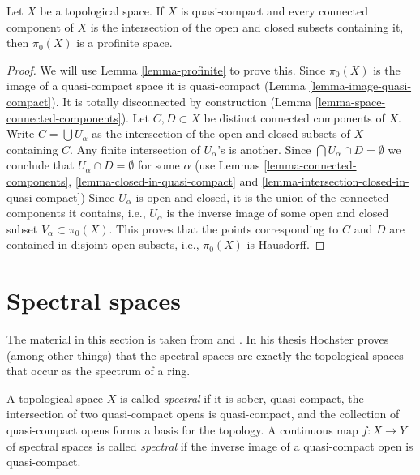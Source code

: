 \begin{lemma}
\label{lemma-pi0-profinite}
Let $X$ be a topological space. If $X$ is quasi-compact
and every connected component of $X$ is the intersection
of the open and closed subsets containing it, then $\pi_0(X)$
is a profinite space.
\end{lemma}

\begin{proof}
We will use Lemma \ref{lemma-profinite} to prove this.
Since $\pi_0(X)$ is the image of a quasi-compact space it is
quasi-compact (Lemma \ref{lemma-image-quasi-compact}).
It is totally disconnected by construction
(Lemma \ref{lemma-space-connected-components}).
Let $C, D \subset X$ be distinct connected components of $X$.
Write $C = \bigcup U_\alpha$ as the intersection of the open and
closed subsets of $X$ containing $C$. Any finite intersection
of $U_\alpha$'s is another. Since $\bigcap U_\alpha \cap D = \emptyset$
we conclude that $U_\alpha \cap D = \emptyset$ for some $\alpha$
(use Lemmas \ref{lemma-connected-components},
\ref{lemma-closed-in-quasi-compact} and
\ref{lemma-intersection-closed-in-quasi-compact})
Since $U_\alpha$ is open and closed, it is the union of the
connected components it contains, i.e., $U_\alpha$ is the inverse
image of some open and closed subset $V_\alpha \subset \pi_0(X)$.
This proves that the points corresponding to $C$ and $D$
are contained in disjoint open subsets, i.e., $\pi_0(X)$ is
Hausdorff.
\end{proof}






\section{Spectral spaces}
\label{section-spectral}

\noindent
The material in this section is taken from \cite{Hochster} and
\cite{Hochster-thesis}. In his thesis Hochster proves (among
other things) that the spectral spaces are exactly the topological
spaces that occur as the spectrum of a ring.

\begin{definition}
\label{definition-spectral-space}
A topological space $X$ is called {\it spectral} if it is sober,
quasi-compact, the intersection of two quasi-compact opens is
quasi-compact, and the collection of quasi-compact opens forms a
basis for the topology. A continuous map $f : X \to Y$ of spectral
spaces is called {\it spectral} if the inverse image of a quasi-compact
open is quasi-compact.
\end{definition}

